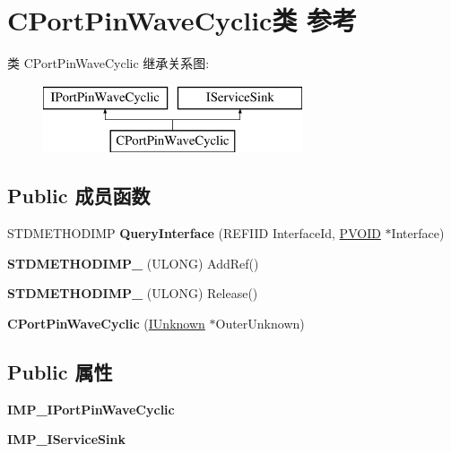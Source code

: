 \hypertarget{class_c_port_pin_wave_cyclic}{}\section{C\+Port\+Pin\+Wave\+Cyclic类 参考}
\label{class_c_port_pin_wave_cyclic}
类 C\+Port\+Pin\+Wave\+Cyclic 继承关系图\+:\begin{figure}[H]
\begin{center}
\leavevmode
\includegraphics[height=2.000000cm]{class_c_port_pin_wave_cyclic}
\end{center}
\end{figure}
\subsection*{Public 成员函数}
\begin{DoxyCompactItemize}
\item 
\mbox{\label{class_c_port_pin_wave_cyclic_a480558cf3ea759d466fe16ca5da871cb}} 
S\+T\+D\+M\+E\+T\+H\+O\+D\+I\+MP {\bfseries Query\+Interface} (R\+E\+F\+I\+ID Interface\+Id, \hyperlink{interfacevoid}{P\+V\+O\+ID} $\ast$Interface)
\item 
\mbox{\label{class_c_port_pin_wave_cyclic_a3c8d7f7e87d793f8725c2fbd77f3e285}} 
{\bfseries S\+T\+D\+M\+E\+T\+H\+O\+D\+I\+M\+P\+\_\+} (U\+L\+O\+NG) Add\+Ref()
\item 
\mbox{\label{class_c_port_pin_wave_cyclic_aac44cf2d8cf5a1ebb69b4b81180e1e8a}} 
{\bfseries S\+T\+D\+M\+E\+T\+H\+O\+D\+I\+M\+P\+\_\+} (U\+L\+O\+NG) Release()
\item 
\mbox{\label{class_c_port_pin_wave_cyclic_ada73c49ac6f3a0d3fc49609e200a6142}} 
{\bfseries C\+Port\+Pin\+Wave\+Cyclic} (\hyperlink{interface_i_unknown}{I\+Unknown} $\ast$Outer\+Unknown)
\end{DoxyCompactItemize}
\subsection*{Public 属性}
\begin{DoxyCompactItemize}
\item 
\mbox{\label{class_c_port_pin_wave_cyclic_a0dabc8317763b0ff10d02c752b7ded22}} 
{\bfseries I\+M\+P\+\_\+\+I\+Port\+Pin\+Wave\+Cyclic}
\item 
\mbox{\label{class_c_port_pin_wave_cyclic_a44137745ee0861f8bc4e386fd8d1915c}} 
{\bfseries I\+M\+P\+\_\+\+I\+Service\+Sink}
\end{DoxyCompactItemize}
